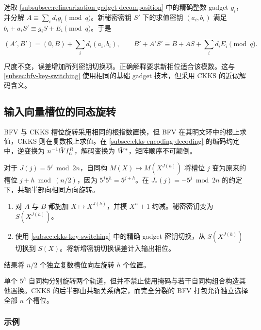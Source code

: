 选取 \autoref{subsubsec:relinearization-gadget-decomposition} 中的精确整数 gadget $g_i$，并分解 $A\equiv\sum_i d_ig_i\pmod q$。新秘密密钥 $S'$ 下的求值密钥 $(a_i,b_i)$ 满足 $b_i+a_iS'\equiv g_iS+E_i\pmod q$。于是
\begin{tcolorbox}[title={\textbf{\tboxlabel{\ref*{subsec:ckks-key-switching}} CKKS 密钥切换}}]
\[
(A',B')=(0,B)+\sum_i d_i(a_i,b_i),\qquad
B'+A'S'\equiv B+AS+\sum_i d_iE_i\pmod q.
\]
\end{tcolorbox}
尺度不变，误差增加所列密钥切换项。正确解释要求新相位适合该模数。这与 \autoref{subsec:bfv-key-switching} 使用相同的基础 gadget 技术，但采用 CKKS 的近似解码含义。


\subsection{输入向量槽位的同态旋转}
\label{subsec:ckks-rotation}

BFV 与 CKKS 槽位旋转采用相同的根指数置换，但 BFV 在其明文环中的根上求值，CKKS 则在复数根上求值。在 \autoref{subsec:ckks-encoding-decoding} 的编码约定中，逆变换为 $n^{-1}\tilde W I_n^R$，解码变换为 $\tilde W^*$，矩阵顺序不可颠倒。

对于 $J(j)=5^j\bmod2n$，自同构 $M(X)\mapsto M(X^{J(h)})$ 将槽位 $j$ 变为原来的槽位 $j+h\bmod(n/2)$，因为 $5^j5^h=5^{j+h}$。在 $J_*(j)=-5^j\bmod2n$ 的约定下，共轭半部向相同方向旋转。
\begin{tcolorbox}[title={\textbf{\tboxlabel{\ref*{subsec:ckks-rotation}} CKKS 输入向量槽位的同态旋转}}]
\begin{enumerate}
\item 对 $A$ 与 $B$ 都施加 $X\mapsto X^{J(h)}$，并模 $X^n+1$ 约减。秘密密钥变为 $S(X^{J(h)})$。
\item 使用 \autoref{subsec:ckks-key-switching} 中的精确 gadget 密钥切换，从 $S(X^{J(h)})$ 切换到 $S(X)$。将新增密钥切换误差计入输出相位。
\end{enumerate}
结果将 $n/2$ 个独立复数槽位向左旋转 $h$ 个位置。
\end{tcolorbox}

 单个 $5^h$ 自同构分别旋转两个轨道，但并不禁止使用掩码与若干自同构组合构造其他置换。CKKS 的后半部由共轭关系确定，而完全分裂的 BFV 打包允许独立选择全部 $n$ 个槽位。


\subsubsection{示例}
\label{subsubsec:ckks-rotation-ex}

